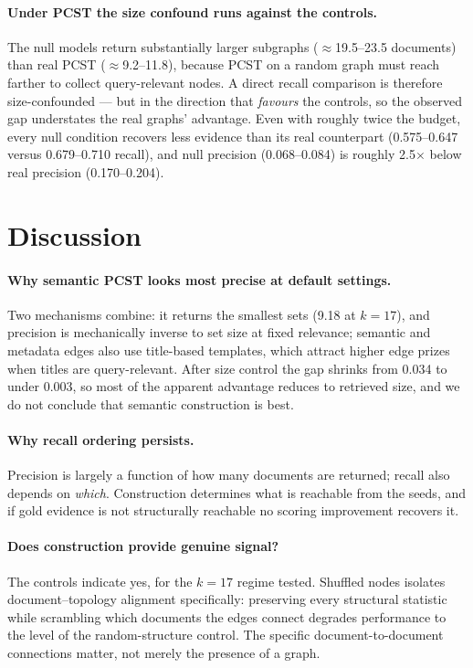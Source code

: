\documentclass[11pt]{article}
\begin{document}
\paragraph{Under PCST the size confound runs against the controls.} The null models return substantially larger subgraphs ($\approx$19.5--23.5 documents) than real PCST ($\approx$9.2--11.8), because PCST on a random graph must reach farther to collect query-relevant nodes. A direct recall comparison is therefore size-confounded --- but in the direction that \textit{favours} the controls, so the observed gap understates the real graphs' advantage. Even with roughly twice the budget, every null condition recovers less evidence than its real counterpart (0.575--0.647 versus 0.679--0.710 recall), and null precision (0.068--0.084) is roughly 2.5$\times$ below real precision (0.170--0.204).

\section{Discussion}

\paragraph{Why semantic PCST looks most precise at default settings.} Two mechanisms combine: it returns the smallest sets (9.18 at $k{=}17$), and precision is mechanically inverse to set size at fixed relevance; semantic and metadata edges also use title-based templates, which attract higher edge prizes when titles are query-relevant. After size control the gap shrinks from 0.034 to under 0.003, so most of the apparent advantage reduces to retrieved size, and we do not conclude that semantic construction is best.

\paragraph{Why recall ordering persists.} Precision is largely a function of how many documents are returned; recall also depends on \textit{which}. Construction determines what is reachable from the seeds, and if gold evidence is not structurally reachable no scoring improvement recovers it.

\paragraph{Does construction provide genuine signal?} The controls indicate yes, for the $k{=}17$ regime tested. Shuffled nodes isolates document--topology alignment specifically: preserving every structural statistic while scrambling which documents the edges connect degrades performance to the level of the random-structure control. The specific document-to-document connections matter, not merely the presence of a graph.
\end{document}
